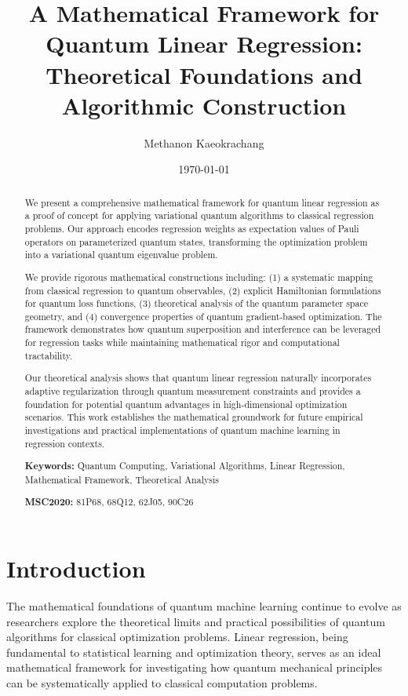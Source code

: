 \documentclass[11pt]{article}
\title{\Large\bfseries A Mathematical Framework for Quantum Linear Regression: \\
Theoretical Foundations and Algorithmic Construction}
\author{Methanon Kaeokrachang}
\affil{Bangkok, Thailand}
\date{%
    \today \\

}
\begin{document}
\maketitle


\vspace{1em}

\begin{abstract}
\noindent We present a comprehensive mathematical framework for quantum linear regression as a proof of concept for applying variational quantum algorithms to classical regression problems. Our approach encodes regression weights as expectation values of Pauli operators on parameterized quantum states, transforming the optimization problem into a variational quantum eigenvalue problem. 

We provide rigorous mathematical constructions including: (1) a systematic mapping from classical regression to quantum observables, (2) explicit Hamiltonian formulations for quantum loss functions, (3) theoretical analysis of the quantum parameter space geometry, and (4) convergence properties of quantum gradient-based optimization. The framework demonstrates how quantum superposition and interference can be leveraged for regression tasks while maintaining mathematical rigor and computational tractability.

Our theoretical analysis shows that quantum linear regression naturally incorporates adaptive regularization through quantum measurement constraints and provides a foundation for potential quantum advantages in high-dimensional optimization scenarios. This work establishes the mathematical groundwork for future empirical investigations and practical implementations of quantum machine learning in regression contexts.

\noindent\textbf{Keywords:} Quantum Computing, Variational Algorithms, Linear Regression, Mathematical Framework, Theoretical Analysis

\noindent\textbf{MSC2020:} 81P68, 68Q12, 62J05, 90C26
\end{abstract}

\section{Introduction}

The mathematical foundations of quantum machine learning continue to evolve as researchers explore the theoretical limits and practical possibilities of quantum algorithms for classical optimization problems. Linear regression, being fundamental to statistical learning and optimization theory, serves as an ideal mathematical framework for investigating how quantum mechanical principles can be systematically applied to classical computation problems.
\end{document}
